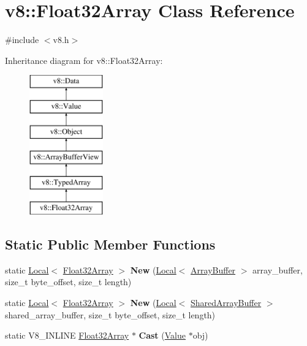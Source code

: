\hypertarget{classv8_1_1_float32_array}{}\section{v8\+:\+:Float32\+Array Class Reference}
\label{classv8_1_1_float32_array}


{\ttfamily \#include $<$v8.\+h$>$}

Inheritance diagram for v8\+:\+:Float32\+Array\+:\begin{figure}[H]
\begin{center}
\leavevmode
\includegraphics[height=6.000000cm]{classv8_1_1_float32_array}
\end{center}
\end{figure}
\subsection*{Static Public Member Functions}
\begin{DoxyCompactItemize}
\item 
static \hyperlink{classv8_1_1_local}{Local}$<$ \hyperlink{classv8_1_1_float32_array}{Float32\+Array} $>$ {\bfseries New} (\hyperlink{classv8_1_1_local}{Local}$<$ \hyperlink{classv8_1_1_array_buffer}{Array\+Buffer} $>$ array\+\_\+buffer, size\+\_\+t byte\+\_\+offset, size\+\_\+t length)\hypertarget{classv8_1_1_float32_array_af7e2ce97268849289d8ab38fd07fbf62}{}\label{classv8_1_1_float32_array_af7e2ce97268849289d8ab38fd07fbf62}

\item 
static \hyperlink{classv8_1_1_local}{Local}$<$ \hyperlink{classv8_1_1_float32_array}{Float32\+Array} $>$ {\bfseries New} (\hyperlink{classv8_1_1_local}{Local}$<$ \hyperlink{classv8_1_1_shared_array_buffer}{Shared\+Array\+Buffer} $>$ shared\+\_\+array\+\_\+buffer, size\+\_\+t byte\+\_\+offset, size\+\_\+t length)\hypertarget{classv8_1_1_float32_array_af3140edf1f13845670f4e4ddd41200c3}{}\label{classv8_1_1_float32_array_af3140edf1f13845670f4e4ddd41200c3}

\item 
static V8\+\_\+\+I\+N\+L\+I\+NE \hyperlink{classv8_1_1_float32_array}{Float32\+Array} $\ast$ {\bfseries Cast} (\hyperlink{classv8_1_1_value}{Value} $\ast$obj)\hypertarget{classv8_1_1_float32_array_adf926d03cacd4b3901d7f9750671a350}{}\label{classv8_1_1_float32_array_adf926d03cacd4b3901d7f9750671a350}

\end{DoxyCompactItemize}

